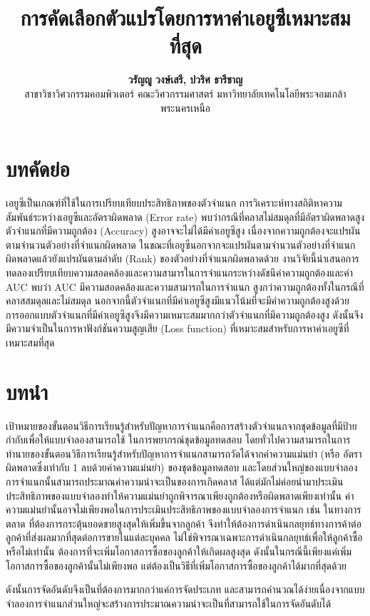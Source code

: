 \documentclass[twoside, twocolumn, 12pt]{article}
\title{\textbf{การคัดเลือกตัวแปรโดยการหาค่าเอยูซีเหมาะสมที่สุด}}
\author{%
\textbf{วรัญญู วงษ์เสรี, ปวริศ ธารีชาญ}\\[1ex]
 สาขาวิชาวิศวกรรมคอมพิวเตอร์ คณะวิศวกรรมศาสตร์ มหาวิทยาลัยเทคโนโลยีพระจอมเกล้าพระนครเหนือ %
}
\date{}
\begin{document}
\maketitle
\section*{บทคัดย่อ}
\quad เอยูซีเป็นเกณฑ์ที่ใช้ในการเปรียบเทียบประสิทธิภาพของตัวจำแนก การวิเคราะห์ทางสถิติหาความสัมพันธ์ระหว่างเอยูซีและอัตราผิดพลาด (Error rate) พบว่ากรณีที่คลาสไม่สมดุลที่มีอัตราผิดพลาดสูง ตัวจำแนกที่มีความถูกต้อง (Accuracy) สูงอาจจะไม่ได้มีค่าเอยูซีสูง เนื่องจากความถูกต้องจะแปรผันตามจำนวนตัวอย่างที่จำแนกผิดพลาด ในขณะที่เอยูซีนอกจากจะแปรผันตามจำนวนตัวอย่างที่จำแนกผิดพลาดแล้วยังแปรผันตามลำดับ (Rank) ของตัวอย่างที่จำแนกผิดพลาดด้วย งานวิจัยนี้นำเสนอการทดลองเปรียบเทียบความสอดคล้องและความสามารในการจำแนกระหว่างดัชนีค่าความถูกต้องและค่า AUC พบว่า AUC มีความสอดคล้องและความสามารถในการจำแนก สูงกว่าความถูกต้องทั้งในกรณีที่คลาสสมดุลและไม่สมดุล นอกจากนี้ตัวจำแนกที่มีค่าเอยูซีสูงมีแนวโน้มที่จะมีค่าความถูกต้องสูงด้วย การออกแบบตัวจำแนกที่มีค่าเอยูซีสูงจึงมีความเหมาะสมมากกว่าตัวจำแนกที่มีความถูกต้องสูง ดังนั้นจึงมีความจำเป็นในการหาฟังก์ชันความสูญเสีย (Loss function) ที่เหมาะสมสำหรับการหาค่าเอยูซีที่เหมาะสมที่สุด
\section{บทนำ}
เป้าหมายของขั้นตอนวิธีการเรียนรู้สำหรับปัญหาการจำแนกคือการสร้างตัวจำแนกจากชุดข้อมูลที่มีป้ายกำกับเพื่อให้แบบจำลองสามารถใช้ ในการพยากรณ์ชุดข้อมูลทดสอบ โดยทั่วไปความสามารถในการทำนายของขั้นตอนวิธีการเรียนรู้สำหรับปัญหาการจำแนกสามารถวัดได้จากค่าความแม่นยำ (หรือ อัตราผิดพลาดซึ่งเท่ากับ 1 ลบด้วยค่าความแม่นยำ) ของชุดข้อมูลทดสอบ และโดยส่วนใหญ่ของแบบจำลองการจำแนกนั้นสามารถประมาณค่าความน่าจะเป็นของการเกิดคลาส ได้แต่มักไม่ค่อยนำมาประเมินประสิทธิภาพของแบบจำลองทำให้ความแม่นยำถูกพิจารณาเพียงถูกต้องหรือผิดพลาดเพียงเท่านั้น 
ค่าความแม่นยำนั้นอาจไม่เพียงพอในการประเมินประสิทธิภาพของแบบจำลองการจำแนก เช่น ในทางการตลาด ที่ต้องการกระตุ้นยอดขายสูงสุดให้เพิ่มขึ้นจากลูกค้า จึงทำให้ต้องการดําเนินกลยุทธ์ทางการค้าต่อลูกค้าที่ส่งผลมากที่สุดต่อการขายในแต่ละบุคคล ไม่ใช่พิจารณาเฉพาะการดำเนินกลยุทธ์เพื่อให้ลูกค้าซื้อหรือไม่เท่านั้น ต้องการที่จะเพิ่มโอกาสการซื้อของลูกค้าให้เกิดผลสูงสุด ดังนั้นในกรณีนี้เพียงแค่เพิ่มโอกาสการซื้อของลูกค้านั้นไม่เพียงพอ แต่ต้องเป็นวิธีที่เพิ่มโอกาสการซื้อของลูกค้าได้มากที่สุดด้วย

ดังนั้นการจัดอันดับจึงเป็นที่ต้องการมากกว่าแค่การจัดประเภท และสามารถคำนวณได้ง่ายเนื่องจากแบบจำลองการจำแนกส่วนใหญ่จะสร้างการประมาณความน่าจะเป็นที่สามารถใช้ในการจัดอันดับได้
\end{document}
